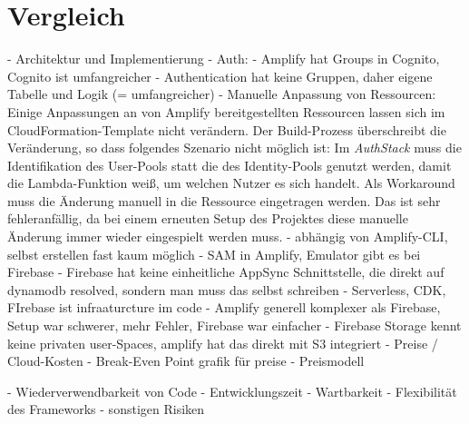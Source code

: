 \chapter{Vergleich}

- Architektur und Implementierung
  - Auth:
    - Amplify hat Groups in Cognito, Cognito ist umfangreicher
    - Authentication hat keine Gruppen, daher eigene Tabelle und Logik (= umfangreicher)
  - Manuelle Anpassung von Ressourcen: Einige Anpassungen an von Amplify bereitgestellten Ressourcen lassen sich im CloudFormation-Template nicht verändern. Der Build-Prozess überschreibt die Veränderung, so dass folgendes Szenario nicht möglich ist: Im \textit{AuthStack} muss die Identifikation des User-Pools statt die des Identity-Pools genutzt werden, damit die Lambda-Funktion weiß, um welchen Nutzer es sich handelt. Als Workaround muss die Änderung manuell in die Ressource eingetragen werden. Das ist sehr fehleranfällig, da bei einem erneuten Setup des Projektes diese manuelle Änderung immer wieder eingespielt werden muss.
    - abhängig von Amplify-CLI, selbst erstellen fast kaum möglich
 - SAM in Amplify, Emulator gibt es bei Firebase
 - Firebase hat keine einheitliche AppSync Schnittstelle, die direkt auf dynamodb resolved, sondern man muss das selbst schreiben
 - Serverless, CDK, FIrebase ist infraaturcture im code
 - Amplify generell komplexer als Firebase, Setup war schwerer, mehr Fehler, Firebase war einfacher
 - Firebase Storage kennt keine privaten user-Spaces, amplify hat das direkt mit S3 integriert
- Preise / Cloud-Kosten
  - Break-Even Point grafik für preise
  - Preismodell

- Wiederverwendbarkeit von Code
- Entwicklungszeit
- Wartbarkeit
- Flexibilität des Frameworks
- sonstigen Risiken